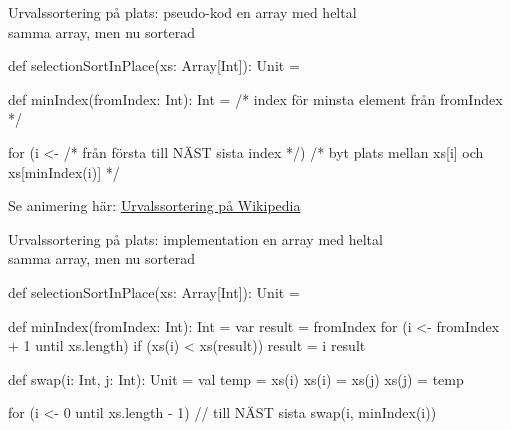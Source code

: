 
\begin{Slide}{Urvalssortering på plats: pseudo-kod}
 en array med heltal\\
 samma array, men nu sorterad\\

\begin{Code}
def selectionSortInPlace(xs: Array[Int]): Unit = {
  def minIndex(fromIndex: Int): Int = {
    /* index för minsta element från fromIndex  */
  }

  for (i <- /* från första till NÄST sista index */) {
    /* byt plats mellan xs[i] och xs[minIndex(i)] */
  }
}
\end{Code}
\pause
Se animering här: \href{https://sv.wikipedia.org/wiki/Urvalssortering}{Urvalssortering på Wikipedia}
\end{Slide}

\begin{Slide}{Urvalssortering på plats: implementation} %
  \SlideFontSmall
\vspace{-0.25em}
 en array med heltal\\
 samma array, men nu sorterad\\

\begin{Code}[numberstyle=\ttfamily\SlideFontSize{6}{7.5},numbers=left]
def selectionSortInPlace(xs: Array[Int]): Unit = {
  def minIndex(fromIndex: Int): Int = {
    var result = fromIndex
    for (i <- fromIndex + 1 until xs.length) {
      if (xs(i) < xs(result)) result = i
    }
    result
  }

  def swap(i: Int, j: Int): Unit = {
    val temp = xs(i)
    xs(i) = xs(j)
    xs(j) = temp
  }

  for (i <- 0 until xs.length - 1) { // till NÄST sista
    swap(i, minIndex(i))
  }
}
\end{Code}
\end{Slide}

